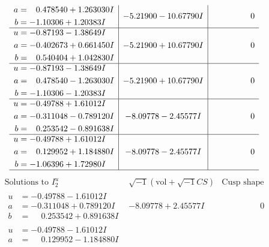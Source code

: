 \documentclass[1p]{elsarticle_modified}
\theoremstyle{definition}
\newcommand{\I}{\sqrt{-1}}
\begin{document}
$$\begin{array}{c|c|c}
\begin{aligned}
a &= \phantom{-}0.478540 + 1.263030 I \\
b &= -1.10306 + 1.20383 I\end{aligned}
 & -5.21900 - 10.67790 I & \phantom{-0.000000 } 0 \\ \hline\begin{aligned}
u &= -0.87193 - 1.38649 I \\
a &= -0.402673 + 0.661450 I \\
b &= \phantom{-}0.540404 + 1.042830 I\end{aligned}
 & -5.21900 + 10.67790 I & \phantom{-0.000000 } 0 \\ \hline\begin{aligned}
u &= -0.87193 - 1.38649 I \\
a &= \phantom{-}0.478540 - 1.263030 I \\
b &= -1.10306 - 1.20383 I\end{aligned}
 & -5.21900 + 10.67790 I & \phantom{-0.000000 } 0 \\ \hline\begin{aligned}
u &= -0.49788 + 1.61012 I \\
a &= -0.311048 - 0.789120 I \\
b &= \phantom{-}0.253542 - 0.891638 I\end{aligned}
 & -8.09778 - 2.45577 I & \phantom{-0.000000 } 0 \\ \hline\begin{aligned}
u &= -0.49788 + 1.61012 I \\
a &= \phantom{-}0.129952 + 1.184880 I \\
b &= -1.06396 + 1.72980 I\end{aligned}
 & -8.09778 - 2.45577 I & \phantom{-0.000000 } 0\\
 \hline 
 \end{array}$$\newpage$$\begin{array}{c|c|c}  
\text{Solutions to }I^u_{2}& \I (\text{vol} + \sqrt{-1}CS) & \text{Cusp shape}\\
 \hline 
\begin{aligned}
u &= -0.49788 - 1.61012 I \\
a &= -0.311048 + 0.789120 I \\
b &= \phantom{-}0.253542 + 0.891638 I\end{aligned}
 & -8.09778 + 2.45577 I & \phantom{-0.000000 } 0 \\ \hline\begin{aligned}
u &= -0.49788 - 1.61012 I \\
a &= \phantom{-}0.129952 - 1.184880 I \\

\end{aligned}
\end{array}$$
\end{document}
